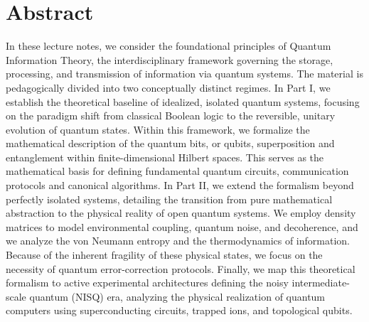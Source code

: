 \chapter*{Abstract}

In these lecture notes, we consider the foundational principles of Quantum Information Theory, the
interdisciplinary framework governing the storage, processing, and transmission of information via
quantum systems. The material is pedagogically divided into two conceptually distinct regimes. In
Part I, we establish the theoretical baseline of idealized, isolated quantum systems, focusing on
the paradigm shift from classical Boolean logic to the reversible, unitary evolution of quantum
states. Within this framework, we formalize the mathematical description of the quantum bits, or
qubits, superposition and entanglement within finite-dimensional Hilbert spaces. This serves as the
mathematical basis for defining fundamental quantum circuits, communication protocols and canonical
algorithms. In Part II, we extend the formalism beyond perfectly isolated systems, detailing the
transition from pure mathematical abstraction to the physical reality of open quantum systems. We
employ density matrices to model environmental coupling, quantum noise, and decoherence, and we
analyze the von Neumann entropy and the thermodynamics of information. Because of the inherent
fragility of these physical states, we focus on the necessity of quantum error-correction protocols.
Finally, we map this theoretical formalism to active experimental architectures defining the noisy
intermediate-scale quantum (NISQ) era, analyzing the physical realization of quantum computers using
superconducting circuits, trapped ions, and topological qubits.
